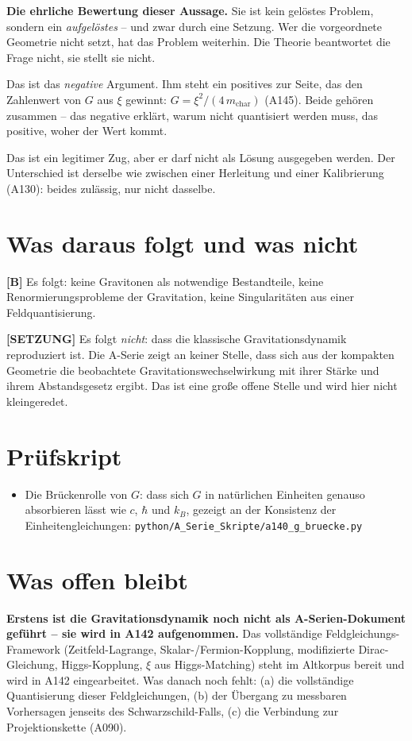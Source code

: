 \textbf{Die ehrliche Bewertung dieser Aussage.} Sie ist kein gelöstes Problem,
sondern ein \emph{aufgelöstes} -- und zwar durch eine Setzung. Wer die
vorgeordnete Geometrie nicht setzt, hat das Problem weiterhin. Die Theorie
beantwortet die Frage nicht, sie stellt sie nicht.

Das ist das \emph{negative} Argument. Ihm steht ein positives zur Seite, das
den Zahlenwert von $G$ aus $\xi$ gewinnt: $G=\xi^2/(4\,m_\text{char})$
(A145). Beide gehören zusammen -- das negative erklärt, warum nicht quantisiert
werden muss, das positive, woher der Wert kommt.

Das ist ein legitimer Zug, aber er darf nicht als Lösung ausgegeben werden. Der
Unterschied ist derselbe wie zwischen einer Herleitung und einer Kalibrierung
(A130): beides zulässig, nur nicht dasselbe.

\section{Was daraus folgt und was nicht}

\textbf{[B]} Es folgt: keine Gravitonen als notwendige Bestandteile, keine
Renormierungsprobleme der Gravitation, keine Singularitäten aus einer
Feldquantisierung.

\textbf{[SETZUNG]} Es folgt \emph{nicht}: dass die klassische
Gravitationsdynamik reproduziert ist. Die A-Serie zeigt an keiner Stelle, dass
sich aus der kompakten Geometrie die beobachtete Gravitationswechselwirkung mit
ihrer Stärke und ihrem Abstandsgesetz ergibt. Das ist eine große offene Stelle
und wird hier nicht kleingeredet.

\section{Prüfskript}

\begin{itemize}
  \item Die Brückenrolle von $G$: dass sich $G$ in natürlichen Einheiten
    genauso absorbieren lässt wie $c$, $\hbar$ und $k_B$, gezeigt an der
    Konsistenz der Einheitengleichungen:
    \texttt{python/A\_Serie\_Skripte/a140\_g\_bruecke.py}
\end{itemize}

\section{Was offen bleibt}

\textbf{Erstens ist die Gravitationsdynamik noch nicht als A-Serien-Dokument
geführt -- sie wird in A142 aufgenommen.} Das vollständige Feldgleichungs-Framework
(Zeitfeld-Lagrange, Skalar-/Fermion-Kopplung, modifizierte Dirac-Gleichung,
Higgs-Kopplung, $\xi$ aus Higgs-Matching) steht im Altkorpus bereit und wird in
A142 eingearbeitet. Was danach noch fehlt: (a) die vollständige Quantisierung
dieser Feldgleichungen, (b) der Übergang zu messbaren Vorhersagen jenseits des
Schwarzschild-Falls, (c) die Verbindung zur Projektionskette (A090).

